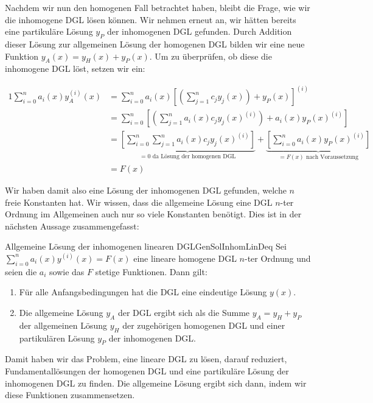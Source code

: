 Nachdem wir nun den homogenen Fall betrachtet haben, bleibt die Frage, wie wir die inhomogene DGL lösen können. Wir nehmen erneut an, wir hätten bereits eine partikuläre Lösung $y_P$ der inhomogenen DGL gefunden. Durch Addition dieser Lösung zur allgemeinen Lösung der homogenen DGL bilden wir eine neue Funktion $y_A(x) = y_H(x) + y_P(x)$. Um zu überprüfen, ob diese die inhomogene DGL löst, setzen wir ein:

\begin{alignat*}{1}
    \sum\limits_{i=0}^n a_i(x) y_A^{(i)}(x) &= \sum\limits_{i=0}^n a_i(x) \left[\left(\sum\limits_{j=1}^n c_j y_j(x)\right) + y_P(x)\right]^{(i)} \\
                                            &= \sum\limits_{i=0}^n \left[ \left(\sum\limits_{j=1}^n a_i(x) c_j y_j(x)^{(i)} \right) + a_i(x) y_P(x)^{(i)} \right] \\
                                            &=  \underbrace{\left[ \sum\limits_{i=0}^n \sum\limits_{j=1}^n a_i(x) c_j y_j(x)^{(i)} \right]}_{=0 \text{ da Lösung der homogenen DGL}} +  \underbrace{\left[ \sum\limits_{i=0}^n a_i(x) y_P(x)^{(i)}  \right]}_{=F(x) \text{ nach Voraussetzung}} \\
                                            &= F(x)
\end{alignat*}

Wir haben damit also eine Lösung der inhomogenen DGL gefunden, welche $n$ freie Konstanten hat. Wir wissen, dass die allgemeine Lösung eine DGL $n$-ter Ordnung im Allgemeinen auch nur so viele Konstanten benötigt. Dies ist in der nächsten Aussage zusammengefasst:

\begin{statement}{Allgemeine Lösung der inhomogenen linearen DGL}{GenSolInhomLinDeq}
    Sei $\sum\limits_{i=0}^n a_i(x) y^{(i)}(x) = F(x)$ eine lineare homogene DGL $n$-ter Ordnung und seien die $a_i$ sowie das $F$ stetige Funktionen. Dann gilt:
    \begin{enumerate}
        \item Für alle Anfangsbedingungen hat die DGL eine eindeutige Lösung $y(x)$.
        \item Die allgemeine Lösung $y_A$ der DGL ergibt sich als die Summe $y_A = y_H + y_P$ der allgemeinen Lösung $y_H$ der zugehörigen homogenen DGL und einer partikulären Lösung $y_P$ der inhomogenen DGL.
    \end{enumerate}
\end{statement}

Damit haben wir das Problem, eine lineare DGL zu lösen, darauf reduziert, Fundamentallösungen der homogenen DGL und eine partikuläre Lösung der inhomogenen DGL zu finden. Die allgemeine Lösung ergibt sich dann, indem wir diese Funktionen zusammensetzen.

